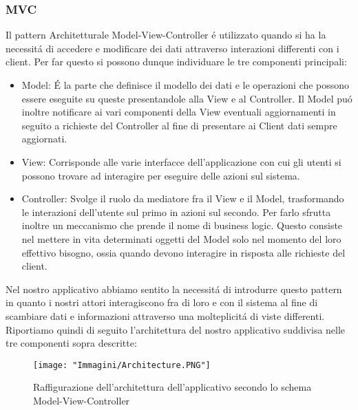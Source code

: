 \documentclass{article}
\begin{document}
\subsubsection{MVC}

Il pattern Architetturale Model-View-Controller \'e utilizzato quando si ha la necessit\'a di accedere e modificare dei dati attraverso interazioni differenti con i client. Per far questo si possono dunque individuare le tre componenti principali:

\begin{itemize}
\item Model: \'E la parte che definisce il modello dei dati e le operazioni che possono essere  eseguite su queste presentandole alla View e al Controller. Il Model pu\'o inoltre notificare ai vari componenti della View eventuali aggiornamenti in seguito a richieste del Controller al fine di presentare ai Client dati sempre aggiornati.

\item View: Corrisponde alle varie interfacce dell'applicazione con cui gli utenti si possono trovare ad interagire per eseguire delle azioni sul sistema.
 
\item Controller: Svolge il ruolo da mediatore fra il View e il Model, trasformando le interazioni dell'utente sul primo in azioni sul secondo. Per farlo sfrutta inoltre un meccanismo che prende il nome di business logic. Questo consiste nel mettere in vita determinati oggetti del Model solo nel momento del loro effettivo bisogno, ossia quando devono interagire in risposta alle richieste del client.
\end{itemize}

\newpage

\noindent Nel nostro applicativo abbiamo sentito la necessit\'a di introdurre questo pattern in quanto i nostri attori interagiscono fra di loro e con il sistema al fine di scambiare dati e informazioni attraverso una molteplicit\'a di viste differenti. \\
Riportiamo quindi di seguito l'architettura del nostro applicativo suddivisa nelle tre componenti sopra descritte:

\begin{figure}[!h]
\centering
\texttt{[image: "Immagini/Architecture.PNG"]}
\caption{Raffigurazione dell'architettura dell'applicativo secondo lo schema Model-View-Controller}
\end{figure}

\newpage
\end{document}
